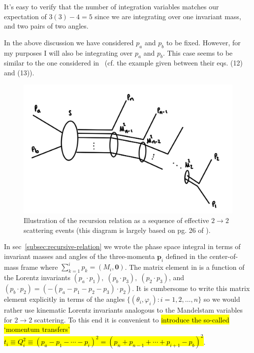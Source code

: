 It's easy to verify that the number of integration variables matches our expectation of $3(3) - 4 = 5$ since we are integrating over one invariant mass, and two pairs of two angles. 

In the above discussion we have considered $p_a$ and $p_b$ to be fixed.
However, for my purposes I will also be integrating over $p_a$ and $p_b$.
This case seems to be similar to the one considered in~\cite{Isaacson:2021xty} (cf. the example given between their eqs. (12) and (13)).


\begin{figure}[t]
    \centering
    \includegraphics[width=0.6\linewidth]{figs/recursion-diagram.jpg}
    \caption{Illustration of the recursion relation as a sequence of effective $2 \rightarrow 2$ scattering events (this diagram is largely based on pg. 26 of \cite{James:1968gu}).}
    \label{fig:recursion-diagram}
\end{figure}

\label{subsec:momentum-transfers}

In sec~\ref{subsec:recursive-relation} we wrote the phase space integral in terms of invariant masses and angles of the three-momenta $\bm{p}_i$ defined in the center-of-mass frame where $\sum_{k=1}^{i} p_k = (M_{i}, \bm{0})$. 
The matrix element in  is a function of the Lorentz invariants $(p_a \cdot p_1), \; (p_b \cdot p_3), \; (p_2 \cdot p_3)$, and $(p_b \cdot p_2) = (- (p_a - p_1 - p_2 - p_3) \cdot p_2)$. 
It is cumbersome to write this matrix element explicitly in terms of the angles $\{ (\theta_i, \varphi_i) : i = 1, 2, \ldots, n\}$ so we would rather use kinematic Lorentz invariants analogous to the Mandelstam variables for $2 \rightarrow 2$ scattering\footnotemark.
To this end it is convenient to \hl{introduce the so-called `momentum transfers' $t_i \equiv Q_i^2 \equiv (p_a - p_1 - \cdots - p_i)^2 = (p_n + p_{n-1} + \cdots + p_{i + 1} - p_b)^2$}.

